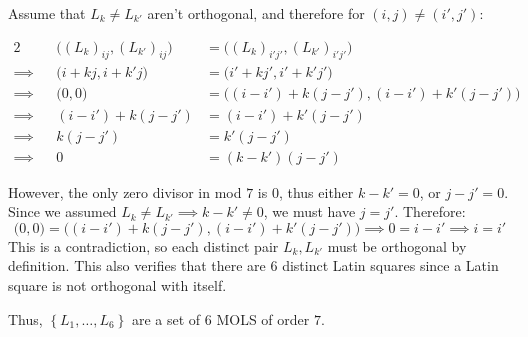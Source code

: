 \documentclass[a4paper, 11pt]{article}
\def\set#1{\left\{ #1 \right\}}
\begin{document}
Assume that $L_k\neq L_{k'}$ aren't orthogonal, and therefore for $(i,j)\neq (i',j')$:

\begin{alignat*}{2}
	         &&\Big((L_k)_{ij}, (L_{k'})_{ij}\Big) &= \Big((L_k)_{i'j'}, (L_{k'})_{i'j'}\Big)\\
	\implies &&\Big(i+kj, i+k'j\Big) &= \Big(i'+kj', i'+k'j'\Big)\\
	\implies &&        \Big(0,0\Big) &= \Big((i-i')+k(j-j'), (i-i')+k'(j-j')\Big) \\
	\implies &&     (i-i') + k(j-j') &=(i-i') + k'(j-j') \\
	\implies &&              k(j-j') &= k'(j-j') \\
	\implies &&                    0 &=(k-k')(j-j') 
\end{alignat*}

However, the only zero divisor in mod $7$ is $0$, thus either $k-k'=0$, or $j-j'=0$. Since we assumed $L_k\neq L_{k'}\implies k-k'\neq0$, we must have $j=j'$. Therefore: 
\[
	\Big(0,0\Big) = \Big((i-i')+k(j-j'), (i-i')+k'(j-j')\Big) \implies 0 =i-i'\implies i=i'
\]
This is a contradiction, so each distinct pair $L_k,L_{k'}$ must be orthogonal by definition. This also verifies that there are $6$ distinct Latin squares since a Latin square is not orthogonal with itself. 

Thus, $\set{L_1,\dots,L_6}$ are a set of $6$ MOLS of order $7$. 

\pagebreak
\end{document}
